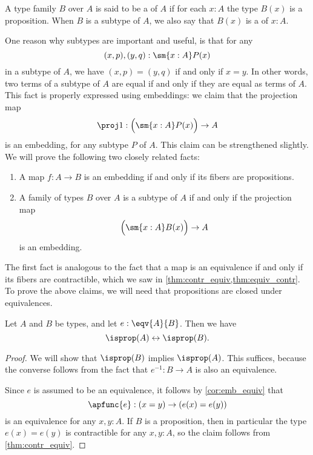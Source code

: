 \begin{defn}
A type family $B$ over $A$ is said to be a  of $A$ if for each $x:A$ the type $B(x)$ is a proposition. When $B$ is a subtype of $A$, we also say that $B(x)$ is a  of $x:A$.
\end{defn}

One reason why subtypes are important and useful, is that for any
\begin{equation*}
  (x,p),(y,q):\sm{x:A}P(x)
\end{equation*}
in a subtype of $A$, we have $(x,p)=(y,q)$ if and only if $x=y$. In other words, two terms of a subtype of $A$ are equal if and only if they are equal as terms of $A$. This fact is properly expressed using embeddings: we claim that the projection map
\begin{equation*}
  \proj 1 : \Big(\sm{x:A}P(x)\Big)\to A
\end{equation*}
is an embedding, for any subtype $P$ of $A$. This claim can be strengthened slightly. We will prove the following two closely related facts:
\begin{enumerate}
\item A map $f:A\to B$ is an embedding if and only if its fibers are propositions.
\item A family of types $B$ over $A$ is a subtype of $A$ if and only if the projection map
  \begin{equation*}
    \Big(\sm{x:A}B(x)\Big)\to A
  \end{equation*}
  is an embedding.
\end{enumerate}
The first fact is analogous to the fact that a map is an equivalence if and only if its fibers are contractible, which we saw in \cref{thm:contr_equiv,thm:equiv_contr}. To prove the above claims, we will need that propositions are closed under equivalences.

\begin{lem}\label{lem:prop_equiv}
Let $A$ and $B$ be types, and let $e:\eqv{A}{B}$. Then we have
\begin{equation*}
\isprop(A)\leftrightarrow\isprop(B).
\end{equation*}
\end{lem}

\begin{proof}
We will show that $\isprop(B)$ implies $\isprop(A)$. This suffices, because the converse follows from the fact that $e^{-1}:B\to A$ is also an equivalence. 

Since $e$ is assumed to be an equivalence, it follows by \cref{cor:emb_equiv} that
\begin{equation*}
\apfunc{e} : (x=y)\to (e(x)=e(y))
\end{equation*}
is an equivalence for any $x,y:A$. If $B$ is a proposition, then in particular the type $e(x)=e(y)$ is contractible for any $x,y:A$, so the claim follows from \cref{thm:contr_equiv}.
\end{proof}

